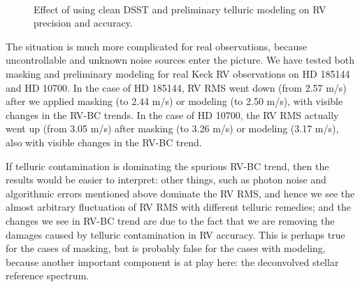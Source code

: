 \begin{figure}
\
\
\
\caption{Effect of using clean DSST and preliminary telluric modeling
  on RV precision and accuracy.
\label{telluric:fig:real}}
\end{figure}


The situation is much more complicated for real observations, because
uncontrollable and unknown noise sources enter the picture. We have
tested both masking and preliminary modeling for real Keck RV
observations on HD 185144 and HD 10700. In the case of HD 185144, RV
RMS went down (from 2.57 m/s) after we applied masking (to 2.44 m/s)
or modeling (to 2.50 m/s), with visible changes in the RV-BC
trends. In the case of HD 10700, the RV RMS actually went up (from
3.05 m/s) after masking (to 3.26 m/s) or modeling (3.17 m/s), also
with visible changes in the RV-BC trend.

If telluric contamination is dominating the spurious RV-BC trend, then
the results would be easier to interpret: other things, such as photon
noise and algorithmic errors mentioned above dominate the RV RMS, and
hence we see the almost arbitrary fluctuation of RV RMS with different
telluric remedies; and the changes we see in RV-BC trend are due to
the fact that we are removing the damages caused by telluric
contamination in RV accuracy. This is perhaps true for the cases of
masking, but is probably false for the cases with modeling, because
another important component is at play here: the deconvolved stellar
reference spectrum.

